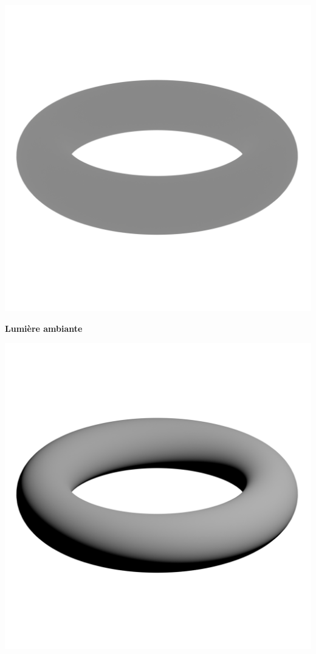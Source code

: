 \documentclass[11pt,class=report,crop=false]{standalone}
\begin{document}
\begin{center}
	\begin{minipage}{0.32\textwidth}
	\center
	\includegraphics[scale=\myscale,scale=0.15, trim={0 6cm 0 4cm}, clip]{figures/tore-ambiante}
	
	{\bf \qquad Lumière ambiante}
	\end{minipage}
	\begin{minipage}{0.32\textwidth}
	\center
	\includegraphics[scale=\myscale,scale=0.15, trim={0 6cm 0 4cm}, clip]{figures/tore-diffuse}
	

\end{minipage}
\end{center}
\end{document}
